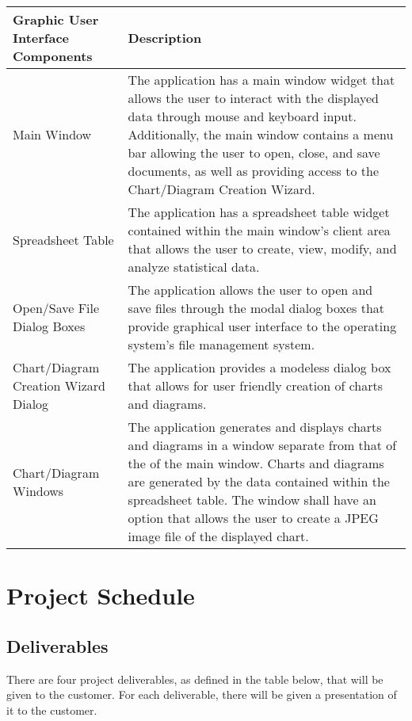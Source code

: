 \documentclass[12pt]{article}
\begin{document}
\begin{center}
\begin{tabularx}{\textwidth}{|p{3cm}|X|}
	\hline \textbf{Graphic User \newline Interface Components} &
		\textbf{Description} \\
	\hline Main Window & The application has a main window widget that allows
		the user to interact with the displayed data through mouse and keyboard
		input. Additionally, the main window contains a menu bar allowing the
		user to open, close, and save documents, as well as providing access to
		the Chart/Diagram Creation Wizard. \\
	\hline Spreadsheet \newline Table & The application has a spreadsheet table
		widget contained within the main window's client area that allows the
		user to create, view, modify, and analyze statistical data. \\
	\hline Open/Save File \newline Dialog Boxes & The application allows the
		user to open and save files through the modal dialog boxes that provide
		graphical user interface to the operating system's file management
		system. \\
	\hline Chart/Diagram \newline Creation Wizard Dialog & The application
		provides a modeless dialog box that allows for user friendly creation
		of charts and diagrams. \\
	\hline Chart/Diagram Windows & The application generates and displays
		charts and diagrams in a window separate from that of the of the main
		window. Charts and diagrams are generated by the data contained within
		the spreadsheet table. The window shall have an option that allows the
		user to create a JPEG image file of the displayed chart. \\
	\hline
\end{tabularx}
\end{center}


\section{Project Schedule}
\subsection{Deliverables}
There are four project deliverables, as defined in the table below, that will
be given to the customer. For each deliverable, there will be given a
presentation of it to the customer.
\end{document}
